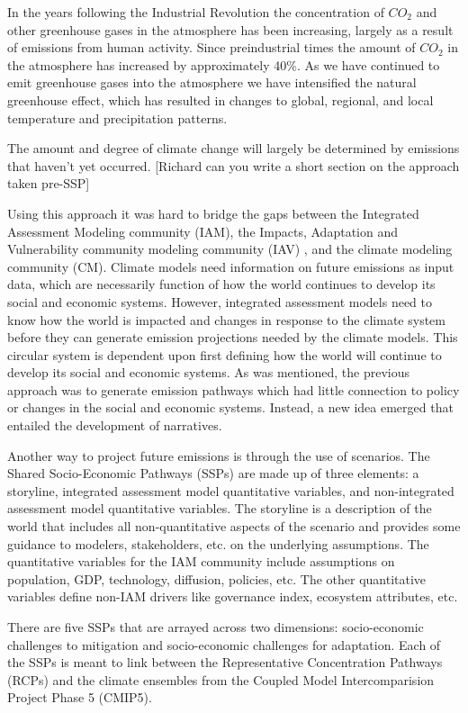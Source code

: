 \documentclass[10pt]{amsart}
\begin{document}
In the years following the Industrial Revolution the concentration of $CO_2$ and other greenhouse gases in the atmosphere has been increasing, largely as a result of emissions from human activity.
Since preindustrial times the amount of $CO_2$ in the atmosphere has increased by approximately 40\%.
As we have continued to emit greenhouse gases into the atmosphere we have intensified the natural greenhouse effect, which has resulted in changes to global, regional, and local temperature and precipitation patterns.

The amount and degree of climate change will largely be determined by emissions that haven't yet occurred.
[Richard can you write a short section on the approach taken pre-SSP]

Using this approach it was hard to bridge the gaps between the Integrated Assessment Modeling community (IAM), the Impacts, Adaptation and Vulnerability community modeling community (IAV) , and the climate modeling community (CM).
Climate models need information on future emissions as input data, which are necessarily function of how the world continues to develop its social and economic systems.
However, integrated assessment models need to know how the world is impacted and changes in response to the climate system before they can generate emission projections needed by the climate models. 
This circular system is dependent upon first defining how the world will continue to develop its social and economic systems.
As was mentioned, the previous approach was to generate emission pathways which had little connection to policy or changes in the social and economic systems.
Instead, a new idea emerged that entailed the development of narratives.

Another way to project future emissions is through the use of scenarios.
The Shared Socio-Economic Pathways (SSPs) are made up of three elements: a storyline, integrated assessment model quantitative variables, and non-integrated assessment model quantitative variables. 
The storyline is a description of the world that includes all non-quantitative aspects of the scenario and provides some guidance to modelers, stakeholders, etc. on the underlying assumptions. 
The quantitative variables for the IAM community include assumptions on population, GDP, technology, diffusion, policies, etc.
The other quantitative variables define non-IAM drivers like governance index, ecosystem attributes, etc.

There are five SSPs that are arrayed across two dimensions: socio-economic challenges to mitigation and socio-economic challenges for adaptation.
Each of the SSPs is meant to link between the Representative Concentration Pathways (RCPs) and the climate ensembles from the Coupled Model Intercomparision Project Phase 5 (CMIP5). 
\end{document}
